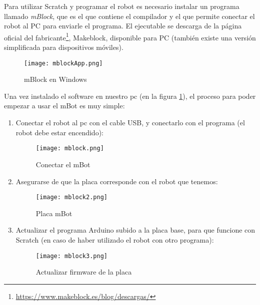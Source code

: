 Para utilizar Scratch y programar el robot es necesario instalar un programa llamado \textit{mBlock}, que es el que contiene el compilador y el que permite conectar el robot al PC para enviarle el programa. El ejecutable se descarga de la página oficial del fabricante\footnote{\href{https://www.makeblock.es/blog/descargas/}{https://www.makeblock.es/blog/descargas/}}, Makeblock, disponible para PC (también existe una versión simplificada para dispositivos móviles).\\
\begin{figure}[h]
	\texttt{[image: mblockApp.png]}
	\centering
	\caption{mBlock en Windows}
	\label{img:mblockApp}
\end{figure}
Una vez instalado el software en nuestro pc (en la figura \ref{img:mblockApp}), el proceso para poder empezar a usar el mBot es muy simple:
\begin{enumerate}\label{list:conexionMblock}
	\item Conectar el robot al pc con el cable USB, y conectarlo con el programa (el robot debe estar encendido):
	\begin{figure}[H]
		\texttt{[image: mblock.png]}
		\centering
		\label{img:mblock}
		\caption{Conectar el mBot}
	\end{figure}

	\item  Asegurarse de que la placa corresponde con el robot que tenemos:
	\begin{figure}[H]
		\texttt{[image: mblock2.png]}
		\centering
		\label{img:mblock2}
		\caption{Placa mBot}
	\end{figure}

	\item Actualizar el programa Arduino subido a la placa base, para que funcione con Scratch (en caso de haber utilizado el robot con otro programa):
	\begin{figure}[H]
		\texttt{[image: mblock3.png]}
		\centering
		\label{img:mblock3}
		\caption{Actualizar firmware de la placa}
	\end{figure}


\end{enumerate}
